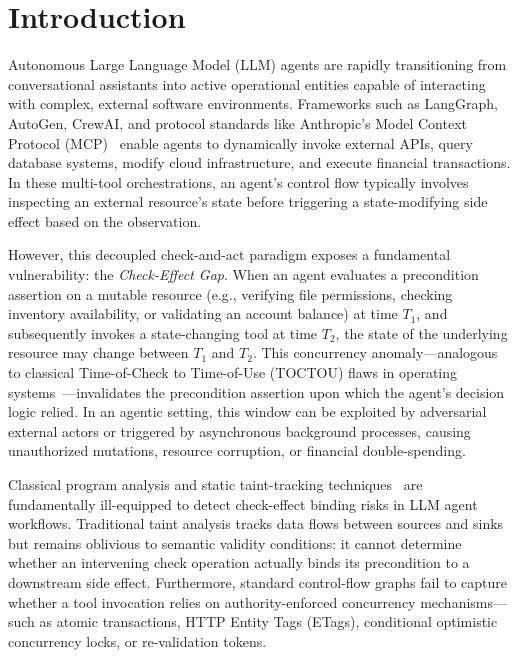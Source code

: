 \section{Introduction}
\label{sec:introduction}

Autonomous Large Language Model (LLM) agents are rapidly transitioning from conversational assistants into active operational entities capable of interacting with complex, external software environments. Frameworks such as LangGraph, AutoGen, CrewAI, and protocol standards like Anthropic's Model Context Protocol (MCP)~\cite{mcp2024spec} enable agents to dynamically invoke external APIs, query database systems, modify cloud infrastructure, and execute financial transactions. In these multi-tool orchestrations, an agent's control flow typically involves inspecting an external resource's state before triggering a state-modifying side effect based on the observation.

However, this decoupled check-and-act paradigm exposes a fundamental vulnerability: the \emph{Check-Effect Gap}. When an agent evaluates a precondition assertion on a mutable resource (e.g., verifying file permissions, checking inventory availability, or validating an account balance) at time $T_1$, and subsequently invokes a state-changing tool at time $T_2$, the state of the underlying resource may change between $T_1$ and $T_2$. This concurrency anomaly—analogous to classical Time-of-Check to Time-of-Use (TOCTOU) flaws in operating systems~\cite{bishop1996checking, wei2005toctou}—invalidates the precondition assertion upon which the agent's decision logic relied. In an agentic setting, this window can be exploited by adversarial external actors or triggered by asynchronous background processes, causing unauthorized mutations, resource corruption, or financial double-spending.

Classical program analysis and static taint-tracking techniques~\cite{arzt2014flowdroid, chen2002model} are fundamentally ill-equipped to detect check-effect binding risks in LLM agent workflows. Traditional taint analysis tracks data flows between sources and sinks but remains oblivious to semantic validity conditions: it cannot determine whether an intervening check operation actually binds its precondition to a downstream side effect. Furthermore, standard control-flow graphs fail to capture whether a tool invocation relies on authority-enforced concurrency mechanisms—such as atomic transactions, HTTP Entity Tags (ETags), conditional optimistic concurrency locks, or re-validation tokens.

